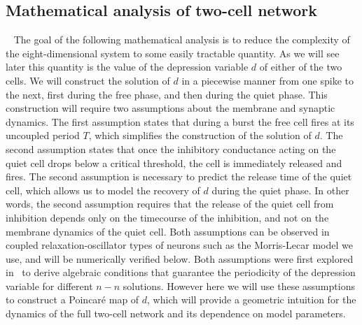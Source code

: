 \documentclass[utf8,draft]{frontiersFPHY} %
\begin{document}
\subsection{Mathematical analysis of two-cell network}
~\label{sec:assumptions}
The goal of the following mathematical analysis is to reduce the complexity of the eight-dimensional system to some easily tractable quantity.
As we will see later this quantity is the value of the depression variable $d$ of either of the two cells.
We will construct the solution of $d$ in a piecewise manner from one spike to the next, first during the free phase, and then during the quiet phase.
This construction will require two assumptions about the membrane and synaptic dynamics.
The first assumption states that during a burst the free cell fires at its uncoupled period $T$, which simplifies the construction of the solution of $d$.
The second assumption states that once the inhibitory conductance acting on the quiet cell drops below a critical threshold, the cell is immediately released and fires.
The second assumption is necessary to predict the release time of the quiet cell, which allows us to model the recovery of $d$ during the quiet phase.
In other words, the second assumption requires that the release of the quiet cell from inhibition depends only on the timecourse of the inhibition, and not on the membrane dynamics of the quiet cell.
Both assumptions can be observed in coupled relaxation-oscillator types of neurons such as the Morris-Lecar model we use, and will be numerically verified below.
Both assumptions were first explored in~\cite{bose2011} to derive algebraic conditions that guarantee the periodicity of the depression variable for different $n-n$ solutions.
However here we will use these assumptions to construct a Poincaré map of $d$, which will provide a geometric intuition for the dynamics of the full two-cell network and its dependence on model parameters.
\end{document}
